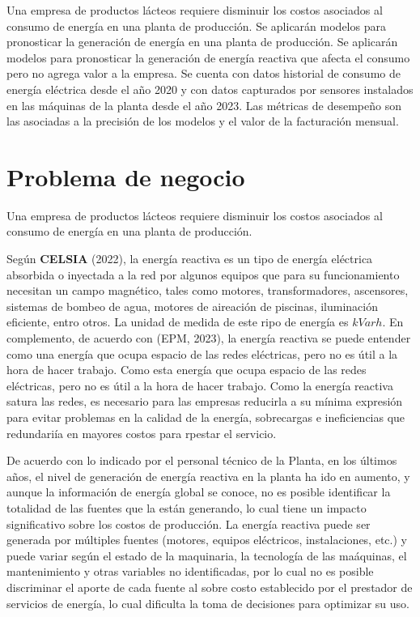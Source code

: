 \setlength{\parindent}{15pt} Una empresa de productos l\'acteos requiere disminuir los costos asociados 
al consumo de energ\'ia en una planta de producci\'on. Se aplicar\'an modelos
para pronosticar la generaci\'on de energ\'ia en una planta de producci\'on. Se aplicar\'an 
modelos para pronosticar la generaci\'on de energ\'ia reactiva que afecta el consumo pero no agrega valor
a la empresa. Se cuenta con datos historial de consumo de energ\'ia el\'ectrica desde el a\~no 2020 y con datos
capturados por sensores instalados en las m\'aquinas de la planta desde el a\~no 2023. Las m\'etricas de desempe\~no son las 
asociadas a la precisi\'on de los modelos y el valor de la facturaci\'on mensual.

\section{Problema de negocio}
\setlength{\parindent}{15pt} Una empresa de productos l\'acteos requiere disminuir los costos 
asociados al consumo de energ\'ia en una planta de producci\'on.

Seg\'un \textbf{CELSIA} (2022), la energ\'ia reactiva es un tipo de energ\'ia el\'ectrica absorbida o inyectada a la red por algunos equipos que para su funcionamiento necesitan un campo 
magn\'etico, tales como motores, transformadores, ascensores, sistemas de bombeo de agua, motores de aireaci\'on de piscinas, iluminaci\'on eficiente, entro otros. La unidad de medida 
de este ripo de energ\'ia es $kVarh$. En complemento, de acuerdo con (EPM, 2023), la energ\'ia reactiva se puede entender como una energ\'ia que ocupa espacio de las redes el\'ectricas, pero 
no es \'util a la hora de hacer trabajo. Como esta energ\'ia que ocupa espacio de las redes el\'ectricas, pero no es \'util a la hora de hacer trabajo. Como la energ\'ia reactiva 
satura las redes, es necesario para las empresas reducirla a su m\'inima expresi\'on para evitar problemas en la calidad de la energ\'ia, sobrecargas e ineficiencias que redundari\'ia en mayores 
costos para rpestar el servicio.

De acuerdo con lo indicado por el personal t\'ecnico de la Planta, en los \'ultimos a\~nos, el nivel de generaci\'on de energ\'ia reactiva en la planta ha ido en aumento, y aunque la informaci\'on 
de energ\'ia global se conoce, no es posible identificar la totalidad de las fuentes que la est\'an generando, lo cual tiene un impacto significativo sobre los costos de producci\'on.
La energ\'ia reactiva puede ser generada por m\'ultiples fuentes (motores, equipos el\'ectricos, instalaciones, etc.) y puede variar seg\'un el estado de la maquinaria, la tecnolog\'ia de las ma\'aquinas, 
el mantenimiento y otras variables no identificadas, por lo cual no es posible discriminar el aporte de cada fuente al sobre costo establecido por el prestador de servicios de energ\'ia, lo cual dificulta la toma de decisiones 
para optimizar su uso. 

